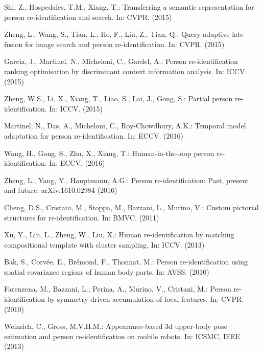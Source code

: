 \documentclass{llncs}
\begin{document}
\begin{thebibliography}{10}
Shi, Z., Hospedales, T.M., Xiang, T.:
\newblock Transferring a semantic representation for person re-identification
  and search.
\newblock In: CVPR. (2015)

Zheng, L., Wang, S., Tian, L., He, F., Liu, Z., Tian, Q.:
\newblock Query-adaptive late fusion for image search and person
  re-identification.
\newblock In: CVPR. (2015)

Garcia, J., Martinel, N., Micheloni, C., Gardel, A.:
\newblock Person re-identification ranking optimisation by discriminant context
  information analysis.
\newblock In: ICCV. (2015)

Zheng, W.S., Li, X., Xiang, T., Liao, S., Lai, J., Gong, S.:
\newblock Partial person re-identification.
\newblock In: ICCV. (2015)

Martinel, N., Das, A., Micheloni, C., Roy{-}Chowdhury, A.K.:
\newblock Temporal model adaptation for person re-identification.
\newblock In: ECCV. (2016)

Wang, H., Gong, S., Zhu, X., Xiang, T.:
\newblock Human-in-the-loop person re-identification.
\newblock In: ECCV. (2016)

Zheng, L., Yang, Y., Hauptmann, A.G.:
\newblock Person re-identification: Past, present and future.
\newblock arXiv:1610.02984 (2016)

Cheng, D.S., Cristani, M., Stoppa, M., Bazzani, L., Murino, V.:
\newblock Custom pictorial structures for re-identification.
\newblock In: BMVC. (2011)

Xu, Y., Lin, L., Zheng, W., Liu, X.:
\newblock Human re-identification by matching compositional template with
  cluster sampling.
\newblock In: ICCV. (2013)

Bak, S., Corv{\'{e}}e, E., Br{\'{e}}mond, F., Thonnat, M.:
\newblock Person re-identification using spatial covariance regions of human
  body parts.
\newblock In: AVSS. (2010)

Farenzena, M., Bazzani, L., Perina, A., Murino, V., Cristani, M.:
\newblock Person re-identification by symmetry-driven accumulation of local
  features.
\newblock In: CVPR. (2010)

Weinrich, C., Gross, M.V.H.M.:
\newblock Appearance-based 3d upper-body pose estimation and person
  re-identification on mobile robots.
\newblock In: ICSMC, IEEE (2013)


\end{thebibliography}
\end{document}
